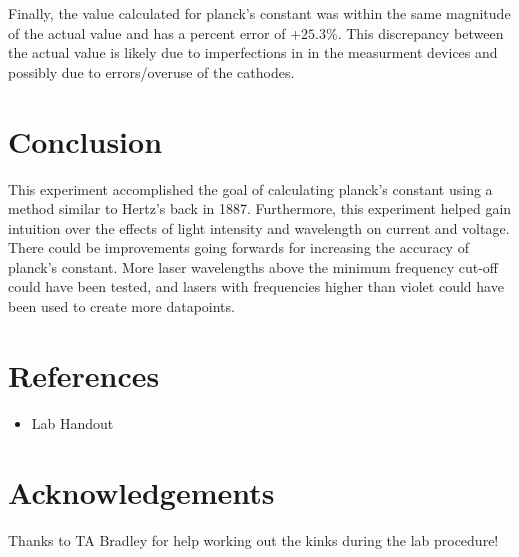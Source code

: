\documentclass{article}[12pt]
\begin{document}
Finally, the value calculated for planck's constant was within the same magnitude of the actual value and has a percent error of $ + 25.3\% $.
This discrepancy between the actual value is likely due to imperfections in in the measurment devices and possibly due to errors/overuse of the cathodes. 

\section{Conclusion}

This experiment accomplished the goal of calculating planck's constant using a method similar to Hertz's back in 1887.
Furthermore, this experiment helped gain intuition over the effects of light intensity and wavelength on current and voltage.
There could be improvements going forwards for increasing the accuracy of planck's constant.
More laser wavelengths above the minimum frequency cut-off could have been tested, and lasers with frequencies higher than violet could have been used to create more datapoints. 

\section{References}
\begin{itemize}
  \item Lab Handout
\end{itemize}

\section{Acknowledgements}

Thanks to TA Bradley for help working out the kinks during the lab procedure!
\end{document}
